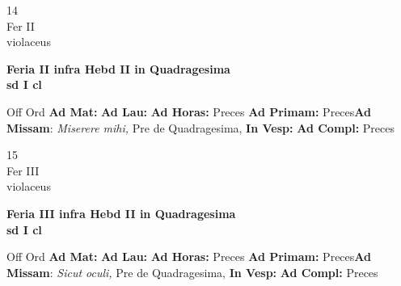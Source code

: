 \documentclass[10pt, openany]{book}
\begin{document}
        \begin{center}
            \begin{minipage}{3.5in}
                \vspace{2em}
                \begin{minipage}{0.5in}
                    {\Huge 14} \\
                    {\normalsize Fer II} \\
                    {\normalsize violaceus}
                \end{minipage}
                \begin{minipage}{3.0in}
                    \textbf{ \large Feria II infra Hebd II in Quadragesima \\
                    \textnormal{\normalsize sd I cl}} \\ 
                \end{minipage}
                \begin{justify}Off Ord
                    \textbf{Ad Mat: }
                    \textbf{Ad Lau: }
                    \textbf{Ad Horas: }Preces
                    \textbf{Ad Primam: }Preces\textbf{Ad Missam}: \textit{Miserere mihi,} Pre de Quadragesima,  
                    \textbf{In Vesp: }
                    \textbf{Ad Compl: }Preces
                \end{justify}
            \end{minipage}
        \end{center}
    
        \begin{center}
            \begin{minipage}{3.5in}
                \vspace{2em}
                \begin{minipage}{0.5in}
                    {\Huge 15} \\
                    {\normalsize Fer III} \\
                    {\normalsize violaceus}
                \end{minipage}
                \begin{minipage}{3.0in}
                    \textbf{ \large Feria III infra Hebd II in Quadragesima \\
                    \textnormal{\normalsize sd I cl}} \\ 
                \end{minipage}
                \begin{justify}Off Ord
                    \textbf{Ad Mat: }
                    \textbf{Ad Lau: }
                    \textbf{Ad Horas: }Preces
                    \textbf{Ad Primam: }Preces\textbf{Ad Missam}: \textit{Sicut oculi,} Pre de Quadragesima,  
                    \textbf{In Vesp: }
                    \textbf{Ad Compl: }Preces
                \end{justify}
            \end{minipage}
        \end{center}
    
\end{document}
